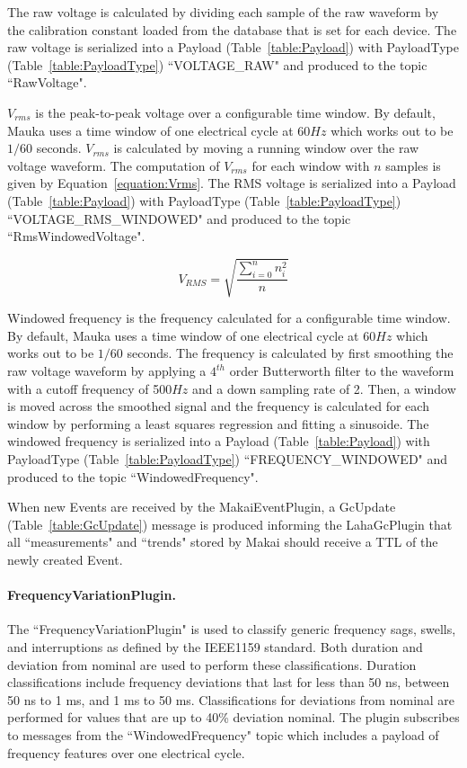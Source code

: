 The raw voltage is calculated by dividing each sample of the raw waveform by the calibration constant loaded from the database that is set for each device. The raw voltage  is serialized into a Payload (Table~\ref{table:Payload}) with PayloadType (Table~\ref{table:PayloadType}) ``VOLTAGE\_RAW" and produced to the topic ``RawVoltage".

$V_{rms}$ is the peak-to-peak voltage over a configurable time window. By default, Mauka uses a time window of one electrical cycle at 60$Hz$ which works out to be $1/60$ seconds. $V_{rms}$ is calculated by moving a running window over the raw voltage waveform. The computation of $V_{rms}$ for each window with $n$ samples is given by Equation~\ref{equation:Vrms}. The RMS voltage is serialized into a Payload (Table~\ref{table:Payload}) with PayloadType (Table~\ref{table:PayloadType}) ``VOLTAGE\_RMS\_WINDOWED" and produced to the topic ``RmsWindowedVoltage".

\begin{equation}
\label{equation:Vrms}
	V_{RMS} = \sqrt{\frac{\sum_{i=0}^{n} n_{i}^2}{n}}
\end{equation}

Windowed frequency is the frequency calculated for a configurable time window. By default, Mauka uses a time window of one electrical cycle at 60$Hz$ which works out to be $1/60$ seconds. The frequency is calculated by first smoothing the raw voltage waveform by applying a $4^{th}$ order Butterworth filter to the waveform with a cutoff frequency of 500$Hz$ and a down sampling rate of 2. Then, a window is moved across the smoothed signal and the frequency is calculated for each window by performing a least squares regression and fitting a sinusoide. The windowed frequency is serialized into a Payload (Table~\ref{table:Payload}) with PayloadType (Table~\ref{table:PayloadType}) ``FREQUENCY\_WINDOWED" and produced to the topic ``WindowedFrequency".

When new Events are received by the MakaiEventPlugin, a GcUpdate (Table~\ref{table:GcUpdate}) message is produced informing the LahaGcPlugin that all ``measurements" and ``trends" stored by Makai should receive a TTL of the newly created Event.

\paragraph{FrequencyVariationPlugin.}
The ``FrequencyVariationPlugin" is used to classify generic frequency sags, swells, and interruptions as defined by the IEEE1159 standard\cite{IEEE:2018:1159D3}. Both duration and deviation from nominal are used to perform these classifications. Duration classifications include frequency deviations that last for less than 50 ns, between 50 ns to 1 ms, and 1 ms to 50 ms. Classifications for deviations from nominal are performed for values that are up to 40\% deviation nominal. The plugin subscribes to messages from the ``WindowedFrequency" topic which includes a payload of frequency features over one electrical cycle.

